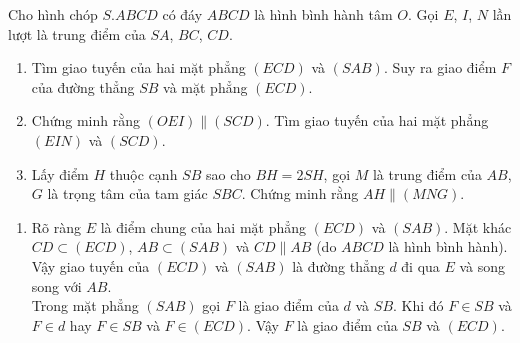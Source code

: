 \begin{bt}%
 Cho hình chóp $S.ABCD$ có đáy $ABCD$ là hình bình hành tâm $O$. Gọi $E$, $I$, $N$ lần lượt là trung điểm của $SA$, $BC$, $CD$.
 \begin{enumerate}
  \item Tìm giao tuyến của hai mặt phẳng $(ECD)$ và $(SAB)$. Suy ra giao điểm $F$ của đường thẳng $SB$ và mặt phẳng $(ECD)$.
  \item Chứng minh rằng $(OEI)\parallel (SCD)$. Tìm giao tuyến của hai mặt phẳng $(EIN)$ và $(SCD)$.
  \item Lấy điểm $H$ thuộc cạnh $SB$ sao cho $BH=2SH$, gọi $M$ là trung điểm của $AB$, $G$ là trọng tâm của tam giác $SBC$. Chứng minh rằng $AH\parallel (MNG)$.
 \end{enumerate}
 \loigiai
  {
  \begin{enumerate}
   \item Rõ ràng $E$ là điểm chung của hai mặt phẳng $(ECD)$ và $(SAB)$. Mặt khác $CD \subset (ECD)$, $AB \subset (SAB)$ và $CD\parallel AB$ (do $ABCD$ là hình bình hành). Vậy giao tuyến của $(ECD)$ và $(SAB)$ là đường thẳng $d$ đi qua  $E$ và song song với $AB$.\\
   Trong mặt phẳng $(SAB)$ gọi $F$ là giao điểm của $d$ và $SB$. Khi đó $F\in SB$ và $F \in d$ hay $F \in SB$ và $F \in (ECD)$. Vậy $F$ là giao điểm của $SB$ và $(ECD)$.
   \begin{center}
\end{center}
\end{enumerate}}
\end{bt}
